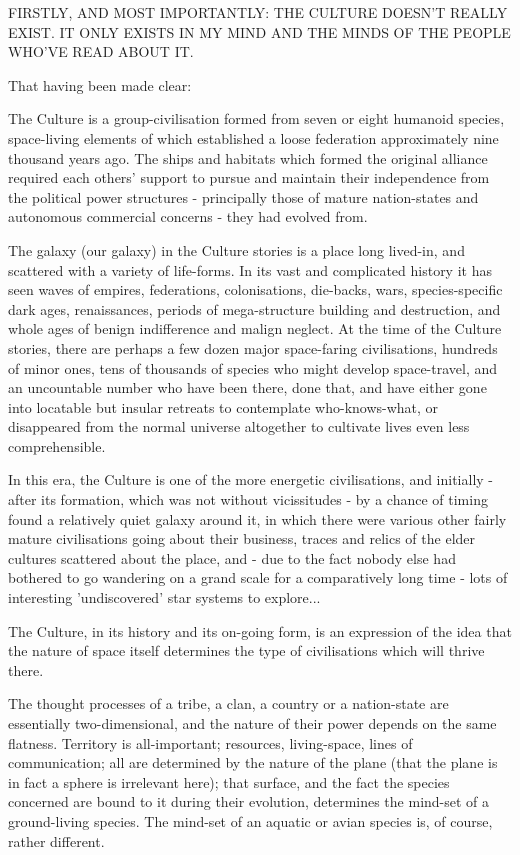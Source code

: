 FIRSTLY, AND MOST IMPORTANTLY: THE CULTURE DOESN'T REALLY EXIST. IT ONLY EXISTS IN MY MIND AND THE MINDS OF THE PEOPLE WHO'VE READ ABOUT IT.

That having been made clear:

The Culture is a group-civilisation formed from seven or eight humanoid species, space-living elements of which established a loose federation approximately nine thousand years ago. The ships and habitats which formed the original alliance required each others' support to pursue and maintain their independence from the political power structures - principally those of mature nation-states and autonomous commercial concerns - they had evolved from.

The galaxy (our galaxy) in the Culture stories is a place long lived-in, and scattered with a variety of life-forms. In its vast and complicated history it has seen waves of empires, federations, colonisations, die-backs, wars, species-specific dark ages, renaissances, periods of mega-structure building and destruction, and whole ages of benign indifference and malign neglect. At the time of the Culture stories, there are perhaps a few dozen major space-faring civilisations, hundreds of minor ones, tens of thousands of species who might develop space-travel, and an uncountable number who have been there, done that, and have either gone into locatable but insular retreats to contemplate who-knows-what, or disappeared from the normal universe altogether to cultivate lives even less comprehensible.

In this era, the Culture is one of the more energetic civilisations, and initially - after its formation, which was not without vicissitudes - by a chance of timing found a relatively quiet galaxy around it, in which there were various other fairly mature civilisations going about their business, traces and relics of the elder cultures scattered about the place, and - due to the fact nobody else had bothered to go wandering on a grand scale for a comparatively long time - lots of interesting 'undiscovered' star systems to explore...

The Culture, in its history and its on-going form, is an expression of the idea that the nature of space itself determines the type of civilisations which will thrive there.

The thought processes of a tribe, a clan, a country or a nation-state are essentially two-dimensional, and the nature of their power depends on the same flatness. Territory is all-important; resources, living-space, lines of communication; all are determined by the nature of the plane (that the plane is in fact a sphere is irrelevant here); that surface, and the fact the species concerned are bound to it during their evolution, determines the mind-set of a ground-living species. The mind-set of an aquatic or avian species is, of course, rather different.

